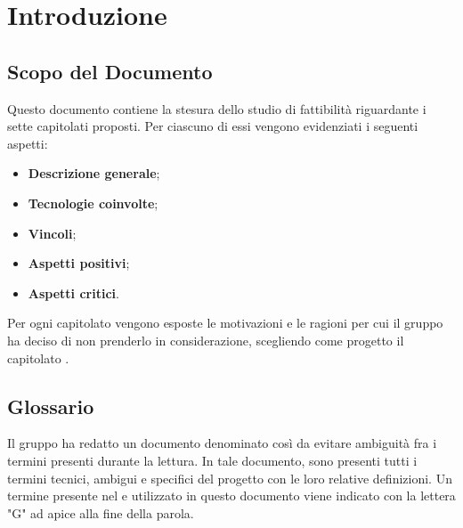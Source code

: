 \section{Introduzione}
\subsection{Scopo del Documento}
Questo documento contiene la stesura dello studio di fattibilità riguardante i sette capitolati proposti. Per ciascuno di essi vengono evidenziati i seguenti aspetti:
\begin{itemize}
    \item \textbf{Descrizione generale};
    \item \textbf{Tecnologie coinvolte};
    \item \textbf{Vincoli};
    \item \textbf{Aspetti positivi};
    \item \textbf{Aspetti critici}.
\end{itemize}
Per ogni capitolato vengono esposte le motivazioni e le ragioni per cui il gruppo ha deciso di non prenderlo in considerazione, scegliendo come progetto il capitolato \NomeProgetto{}.
\subsection{Glossario}
Il gruppo \Gruppo{} ha redatto un documento denominato  così da evitare ambiguità fra i termini presenti durante la lettura.
In tale documento, sono presenti tutti i termini tecnici, ambigui e specifici del progetto con le loro relative definizioni.
Un termine presente nel  e utilizzato in questo documento viene indicato con la lettera "G" ad apice alla fine della parola.

